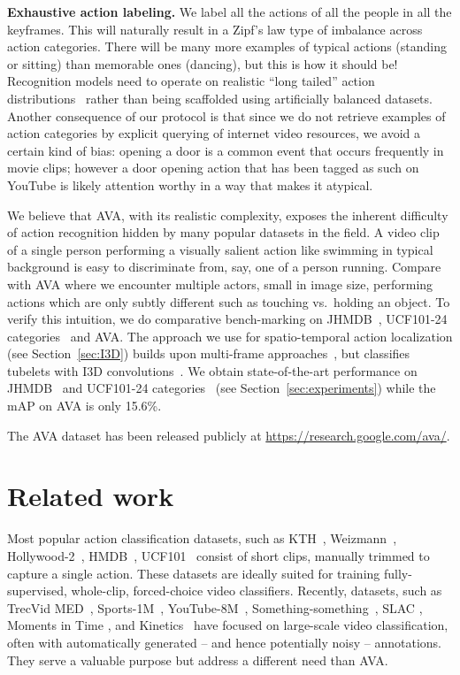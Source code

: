 \documentclass[10pt,twocolumn,letterpaper]{article}
\begin{document}
\noindent \textbf{Exhaustive action labeling.}
We label all the actions of all the people in all the keyframes. This will naturally result in a Zipf's law type of imbalance across action categories. There will be many more examples of typical actions (standing or sitting) than memorable ones (dancing), but this is how it should be!  Recognition models need to operate on realistic ``long tailed'' action distributions~\cite{long_tail17} rather than being scaffolded using artificially balanced datasets. Another consequence of our protocol is that since we do not retrieve examples of action categories by explicit querying of internet video resources, we avoid a certain kind of bias: opening a door is a common event that occurs frequently in movie clips; however a door opening action that has been tagged as such on YouTube is likely attention worthy in a way that makes it atypical.

We believe that AVA, with its realistic complexity, exposes the inherent difficulty of action recognition hidden by many popular datasets in the field. A video clip  of a single person performing a visually salient action like swimming in typical background is  easy to discriminate from, say, one of a person running. Compare with AVA where we encounter multiple actors, small in image size, performing actions which are only subtly different such as touching vs.\ holding an object. To verify this intuition, we do comparative bench-marking on JHMDB~\cite{jhmdb}, UCF101-24 categories~\cite{ucfsports} and AVA. The approach we use for spatio-temporal action localization (see Section~\ref{sec:I3D}) builds upon multi-frame approaches~\cite{T_CNN_iccv17,tubelets_iccv17}, but classifies tubelets with I3D convolutions~\cite{i3d_cvpr17}. We obtain state-of-the-art performance on JHMDB~\cite{jhmdb} and UCF101-24 categories~\cite{ucfsports} (see Section~\ref{sec:experiments}) while the mAP on AVA is only 15.6\%. 

The AVA dataset has been released publicly at \url{https://research.google.com/ava/}.
\vspace{-0.8em} 
\section{Related work}
\label{sec:related}

Most popular action classification datasets, such as KTH~\cite{Schuldt2004}, Weizmann~\cite{Blank2005}, Hollywood-2~\cite{Marszalek2009}, HMDB~\cite{kuehne2011}, UCF101~\cite{ucf101} consist of short clips, manually trimmed to capture a single action. These datasets are ideally suited for training fully-supervised, whole-clip, forced-choice video classifiers. Recently, datasets, such as TrecVid MED~\cite{2014trecvid},  Sports-1M~\cite{Karpathy2014}, YouTube-8M~\cite{youtube8m}, Something-something~\cite{something_iccv17}, SLAC \cite{zhao2017slac}, Moments in Time \cite{monfortmoments}, and Kinetics~\cite{kinetics17} have focused on large-scale video classification, often with automatically generated -- and hence potentially noisy -- annotations. They serve a valuable purpose but address a different need than AVA. 
\end{document}
